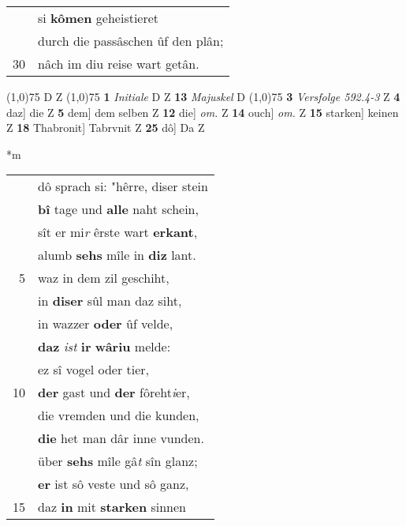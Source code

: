 \documentclass[8pt,a4paper,notitlepage]{article}
\begin{document}
\begin{table}[ht]
\begin{minipage}[t]{0.5\linewidth}
\begin{tabular}{rl}
 & si \textbf{kômen} geheistieret\\ 
 & durch die passâschen ûf den plân;\\ 
30 & nâch im diu reise wart getân.\\ 
\end{tabular}
\scriptsize
\line(1,0){75} \newline
D Z \newline
\line(1,0){75} \newline
\textbf{1} \textit{Initiale} D Z  \textbf{13} \textit{Majuskel} D  \newline
\line(1,0){75} \newline
\textbf{3} \textit{Versfolge 592.4-3} Z  \textbf{4} daz] die Z \textbf{5} dem] dem selben Z \textbf{12} die] \textit{om.} Z \textbf{14} ouch] \textit{om.} Z \textbf{15} starken] keinen Z \textbf{18} Thabronit] Tabrvnit Z \textbf{25} dô] Da Z \newline
\end{minipage}
\hspace{0.5cm}
\begin{minipage}[t]{0.5\linewidth}
\small
\begin{center}*m
\end{center}
\begin{tabular}{rl}
 & dô sprach si: "hêrre, diser stein\\ 
 & \textbf{bî} tage und \textbf{alle} naht schein,\\ 
 & sît er mi\textit{r} êrste wart \textbf{erkant},\\ 
 & alumb \textbf{sehs} mîle in \textbf{diz} lant.\\ 
5 & waz in dem zil geschiht,\\ 
 & in \textbf{diser} sûl man daz siht,\\ 
 & in wazzer \textbf{oder} ûf velde,\\ 
 & \textbf{daz} \textit{ist} \textbf{ir} \textbf{wâriu} melde:\\ 
 & ez sî vogel oder tier,\\ 
10 & \textbf{der} gast und \textbf{der} fôreht\textit{i}er,\\ 
 & die vremden und die kunden,\\ 
 & \textbf{die} het man dâr inne vunden.\\ 
 & über \textbf{sehs} mîle gâ\textit{t} sîn glanz;\\ 
 & \textbf{er} ist sô veste und sô ganz,\\ 
15 & daz \textbf{in} mit \textbf{starken} sinnen\\ 

\end{tabular}
\end{minipage}
\end{table}
\end{document}
